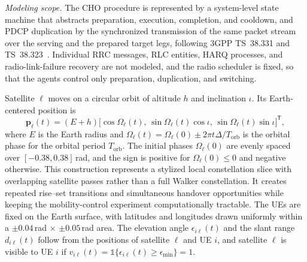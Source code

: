 \documentclass[journal]{IEEEtran}
\newcommand{\ind}{\mathbb{1}}
\begin{document}
\emph{Modeling scope.} The CHO procedure is represented by a system-level state
machine that abstracts preparation, execution, completion, and cooldown, and
PDCP duplication by the synchronized transmission of the same packet stream
over the serving and the prepared target legs, following
3GPP TS~38.331 and TS~38.323~\cite{3gpp38331,3gpp38323}. Individual RRC
messages, RLC entities, HARQ processes, and radio-link-failure recovery are not
modeled, and the radio scheduler is fixed, so that the agents control only
preparation, duplication, and switching.

Satellite $\ell$ moves on a circular orbit of altitude $h$ and inclination
$\iota$. Its Earth-centered position is
\begin{equation}
\mathbf{p}_\ell(t) = (E+h)\big[\cos\Omega_\ell(t),\,\sin\Omega_\ell(t)\cos\iota,\,\sin\Omega_\ell(t)\sin\iota\big]^{\mathsf T},
\label{eq:orbit}
\end{equation}
where $E$ is the Earth radius and
$\Omega_\ell(t)=\Omega_\ell(0)\pm2\pi t\Delta/T_{\mathrm{orb}}$ is the orbital
phase for the orbital period $T_{\mathrm{orb}}$. The initial phases
$\Omega_\ell(0)$ are evenly spaced over $[-0.38,0.38]$\,rad, and the sign is
positive for $\Omega_\ell(0)\le0$ and negative otherwise. This construction
represents a stylized local constellation slice with overlapping satellite
passes rather than a full Walker constellation. It creates repeated rise--set
transitions and simultaneous handover opportunities while keeping the
mobility-control experiment computationally tractable. The UEs are fixed on
the Earth surface, with latitudes and longitudes drawn uniformly within a
$\pm0.04$\,rad $\times$ $\pm0.05$\,rad area. The elevation angle
$\epsilon_{i\ell}(t)$ and the slant range $d_{i\ell}(t)$ follow from the
positions of satellite $\ell$ and UE $i$, and satellite $\ell$ is visible to
UE $i$ if $v_{i\ell}(t)=\ind\{\epsilon_{i\ell}(t)\ge\epsilon_{\min}\}=1$.
\end{document}
